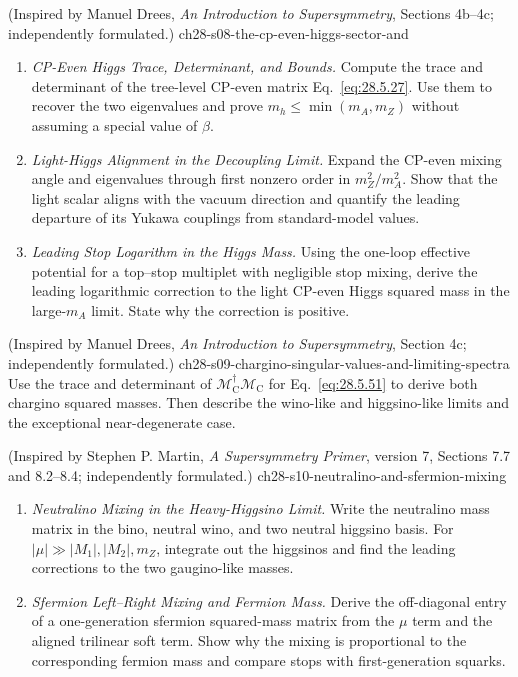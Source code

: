\begin{enumerate}
    {(Inspired by Manuel Drees, \emph{An Introduction to Supersymmetry}, Sections 4b--4c; independently formulated.)}
    {ch28-s08-the-cp-even-higgs-sector-and}
  \begin{enumerate}
    \item \emph{CP-Even Higgs Trace, Determinant, and Bounds.}
    Compute the trace and determinant of the tree-level CP-even matrix
      Eq.~\eqref{eq:28.5.27}.  Use them to recover the two eigenvalues and
      prove \(m_h\leq\min(m_A,m_Z)\) without assuming a special value of
      \(\beta\).
    \item \emph{Light-Higgs Alignment in the Decoupling Limit.}
    Expand the CP-even mixing angle and eigenvalues through first nonzero
      order in \(m_Z^2/m_A^2\).  Show that the light scalar aligns with the
      vacuum direction and quantify the leading departure of its Yukawa
      couplings from standard-model values.
    \item \emph{Leading Stop Logarithm in the Higgs Mass.}
    Using the one-loop effective potential for a top--stop multiplet with
      negligible stop mixing, derive the leading logarithmic correction to
      the light CP-even Higgs squared mass in the large-\(m_A\) limit.  State
      why the correction is positive.
  \end{enumerate}

    {(Inspired by Manuel Drees, \emph{An Introduction to Supersymmetry}, Section 4c; independently formulated.)}
    {ch28-s09-chargino-singular-values-and-limiting-spectra}
Use the trace and determinant of
  \(\mathcal M_{\mathrm C}^\dagger\mathcal M_{\mathrm C}\) for
  Eq.~\eqref{eq:28.5.51} to derive both chargino squared masses.  Then
  describe the wino-like and higgsino-like limits and the exceptional
  near-degenerate case.

    {(Inspired by Stephen P. Martin, \emph{A Supersymmetry Primer}, version 7, Sections 7.7 and 8.2--8.4; independently formulated.)}
    {ch28-s10-neutralino-and-sfermion-mixing}
  \begin{enumerate}
    \item \emph{Neutralino Mixing in the Heavy-Higgsino Limit.}
    Write the neutralino mass matrix in the bino, neutral wino, and two
      neutral higgsino basis.  For \(|\mu|\gg|M_1|,|M_2|,m_Z\), integrate out
      the higgsinos and find the leading corrections to the two gaugino-like
      masses.
    \item \emph{Sfermion Left--Right Mixing and Fermion Mass.}
    Derive the off-diagonal entry of a one-generation sfermion squared-mass
      matrix from the \(\mu\) term and the aligned trilinear soft term.  Show
      why the mixing is proportional to the corresponding fermion mass and
      compare stops with first-generation squarks.
  \end{enumerate}


\end{enumerate}

